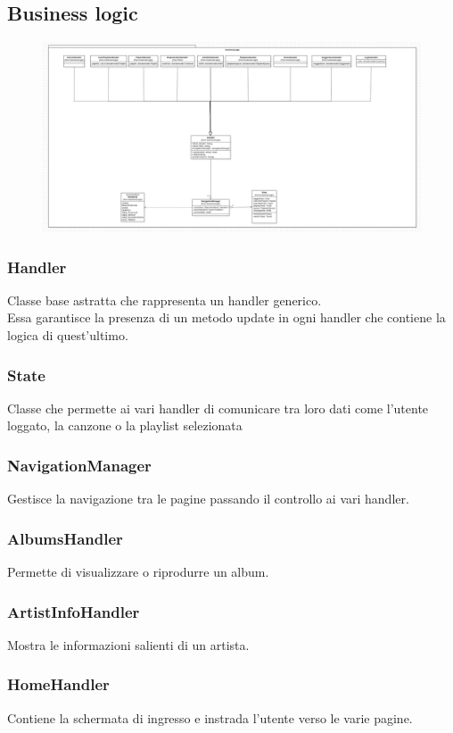 \documentclass{article}
\begin{document}
\subsection{Business logic}

\begin{figure}[H]
\includegraphics[scale=0.28]{logic01}
\end{figure}

\subsubsection{Handler}
Classe base astratta che rappresenta un handler generico.\\
Essa garantisce la presenza di un metodo update in ogni handler che contiene la logica di quest'ultimo.
\subsubsection{State}
Classe che permette ai vari handler di comunicare tra loro dati come
l'utente loggato, la canzone o la playlist selezionata
\subsubsection{NavigationManager}
Gestisce la navigazione tra le pagine passando il controllo ai vari handler.
\subsubsection{AlbumsHandler}
Permette di visualizzare o riprodurre un album.
\subsubsection{ArtistInfoHandler}
Mostra le informazioni salienti di un artista.
\subsubsection{HomeHandler}
Contiene la schermata di ingresso e instrada l'utente verso le varie pagine.
\end{document}
